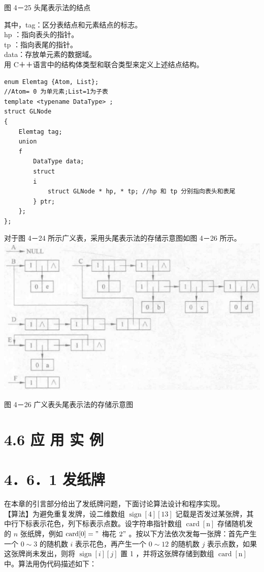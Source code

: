 \documentclass[10pt]{article}
\begin{document}
图 4－25 头尾表示法的结点

其中，tag：区分表结点和元素结点的标志。\\
hp ：指向表头的指针。\\
tp ：指向表尾的指针。\\
data：存放单元素的数据域。\\
用 C＋＋语言中的结构体类型和联合类型来定义上述结点结构。

\begin{verbatim}
enum Elemtag {Atom, List};
//Atom= 0 为单元素;List=1为子表
template <typename DataType> ;
struct GLNode
{
    Elemtag tag;
    union
    f
        DataType data;
        struct
        i
            struct GLNode * hp, * tp; //hp 和 tp 分别指向表头和表尾
        } ptr;
    };
};
\end{verbatim}

对于图 4－24 所示广义表，采用头尾表示法的存储示意图如图 4－26 所示。\\
\includegraphics[max width=\textwidth, center]{2025_06_06_704745ea57b15b2333e5g-132}

图 4－26 广义表头尾表示法的存储示意图

\section*{4.6 应 用 实 例}
\section*{4．6．1 发纸牌}
在本章的引言部分给出了发纸牌问题，下面讨论算法设计和程序实现。\\
【算法】为避免重复发牌，设二维数组 $\operatorname{sign}[4][13]$ 记载是否发过某张牌，其中行下标表示花色，列下标表示点数。设字符串指针数组 $\operatorname{card}[\mathrm{n}]$ 存储随机发的 $n$ 张纸牌，例如 $\operatorname{card}[0]="$ 梅花 $2 "$ 。按以下方法依次发每一张牌：首先产生一个 $0 \sim 3$ 的随机数 $i$ 表示花色，再产生一个 $0 \sim 12$ 的随机数 $j$ 表示点数，如果这张牌尚未发出，则将 $\operatorname{sign}[i][j]$ 置 1 ，并将这张牌存储到数组 $\operatorname{card}[\mathrm{n}]$ 中。算法用伪代码描述如下：
\end{document}
